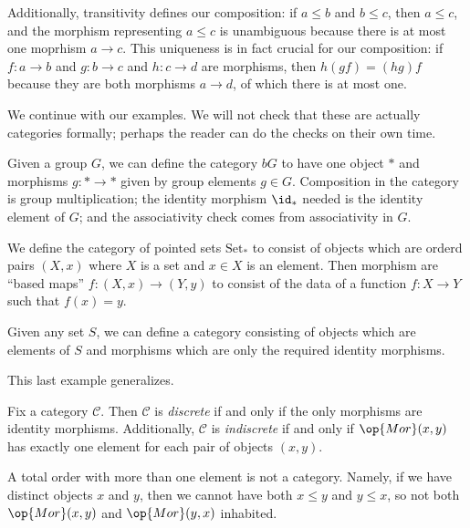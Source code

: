 Additionally, transitivity defines our composition: if $a\le b$ and $b\le c$, then $a\le c$, and the morphism representing $a\le c$ is unambiguous because there is at most one moprhism $a\to c$. This uniqueness is in fact crucial for our composition: if $f:a\to b$ and $g:b\to c$ and $h:c\to d$ are morphisms, then $h(gf)=(hg)f$ because they are both morphisms $a\to d$, of which there is at most one.

We continue with our examples. We will not check that these are actually categories formally; perhaps the reader can do the checks on their own time.
\begin{example}[Groups]
	Given a group $G$, we can define the category $bG$ to have one object $*$ and morphisms $g:*\to*$ given by group elements $g\in G$. Composition in the category is group multiplication; the identity morphism $\id_*$ needed is the identity element of $G$; and the associativity check comes from associativity in $G$.
\end{example}
\begin{example}
	We define the category of pointed sets $\mathrm{Set}_*$ to consist of objects which are orderd pairs $(X,x)$ where $X$ is a set and $x\in X$ is an element. Then morphism are ``based maps'' $f:(X,x)\to(Y,y)$ to consist of the data of a function $f:X\to Y$ such that $f(x)=y$.
\end{example}
\begin{example}
	Given any set $S$, we can define a category consisting of objects which are elements of $S$ and morphisms which are only the required identity morphisms.
\end{example}
This last example generalizes.
\begin{definition}
	Fix a category $\mathcal C$. Then $\mathcal C$ is \textit{discrete} if and only if the only morphisms are identity morphisms. Additionally, $\mathcal C$ is \textit{indiscrete} if and only if $\op{Mor}(x,y)$ has exactly one element for each pair of objects $(x,y)$.
\end{definition}
\begin{warn}
	A total order with more than one element is not a category. Namely, if we have distinct objects $x$ and $y$, then we cannot have both $x\le y$ and $y\le x$, so not both $\op{Mor}(x,y)$ and $\op{Mor}(y,x)$ inhabited.
\end{warn}

